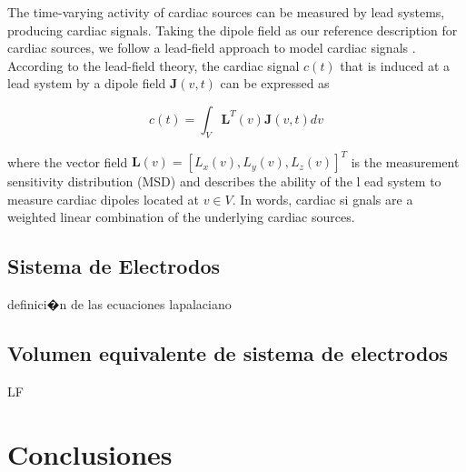  The time-varying activity of cardiac sources can be measured by lead systems,
 producing cardiac signals. Taking the dipole field as our reference description
 for cardiac sources, we follow a lead-field approach to model cardiac signals
 \cite{Malmivuo95}. According to the lead-field theory, the cardiac signal
 $c(t)$ that is induced at a lead system by a dipole field $\mathbf{J}(v,t)$ can
 be expressed as

\begin{equation}\label{eq:EqSintesis}
c(t)=\int_V{\mathbf{L}^{T}(v) \mathbf{J}(v,t)}{dv}
\end{equation}

 where the vector field $\mathbf{L}(v)= [L_x(v), L_y(v), L_z(v)]^T$ is the
 measurement sensitivity distribution (MSD) and describes the ability of the
l ead system to measure cardiac dipoles located at $v\in V$. In words, cardiac
si gnals are a weighted linear combination of the underlying cardiac sources.



\subsection{Sistema de Electrodos}
definici�n de las ecuaciones lapalaciano
\subsection{Volumen equivalente de sistema de electrodos}
 \ac{LF}


\section{Conclusiones}

